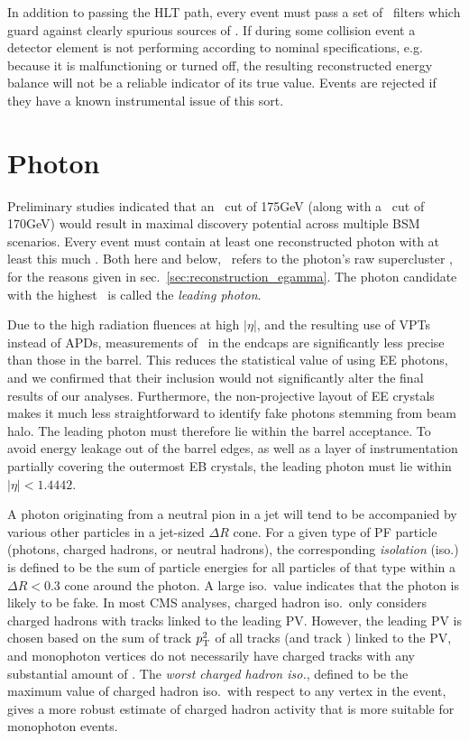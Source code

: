 In addition to passing the HLT path, every event must pass a set of \MET\ filters which guard against clearly spurious sources of \MET. If during some collision event
a detector element is not performing according to nominal specifications, e.g. because it is malfunctioning or turned off, the resulting reconstructed energy balance will
not be a reliable indicator of its true value. Events are rejected if they have a known instrumental issue of this sort.

\section{Photon} \label{sec:event_selection_photon}
Preliminary studies indicated that an \ETgamma\ cut of 175\unit{GeV} (along with a \MET\ cut of 170\unit{GeV}) would result in maximal discovery potential across
multiple BSM scenarios. Every event must contain at least one reconstructed photon with at least this much \ETgamma. Both here and below,
\ETgamma\ refers to the photon's raw supercluster \ET, for the reasons given in sec.~\ref{sec:reconstruction_egamma}. The photon candidate with the highest
\ETgamma\ is called the \textit{leading photon}.

Due to the high radiation fluences at high $|\eta|$, and the resulting use of VPTs instead of APDs, measurements of \ETgamma\ in the endcaps are significantly less precise
than those in the barrel. This reduces the statistical value of using EE photons, and we confirmed that their inclusion would not significantly alter the final results
of our analyses. Furthermore, the non-projective layout of EE crystals makes it much less straightforward to identify fake photons stemming from beam halo.
The leading photon must therefore lie within the barrel acceptance. To avoid energy leakage out of the barrel edges, as well as a layer of instrumentation partially
covering the outermost EB crystals, the leading photon must lie within $|\eta| < 1.4442$.

A photon originating from a neutral pion in a jet will tend to be accompanied by various other particles in a jet-sized $\Delta R$ cone. For a given type of PF particle
(photons, charged hadrons, or neutral hadrons), the corresponding \textit{isolation} (iso.) is defined to be the sum of particle energies for all particles of that type
within a $\Delta R < 0.3$ cone around the photon. A large iso.\ value indicates that the photon is likely to be fake.
In most CMS analyses, charged hadron iso.\ only considers charged hadrons with tracks linked to the leading PV. However,
the leading PV is chosen based on the sum of track $p_\mathrm{T}^{2}$ of all tracks (and track \MET) linked to the PV, and monophoton vertices do not necessarily have charged tracks
with any substantial amount of \pT. The \textit{worst charged hadron iso.}, defined to be the maximum value of charged hadron iso.\ with respect to any vertex in the event,
gives a more robust estimate of charged hadron activity that is more suitable for monophoton events.

